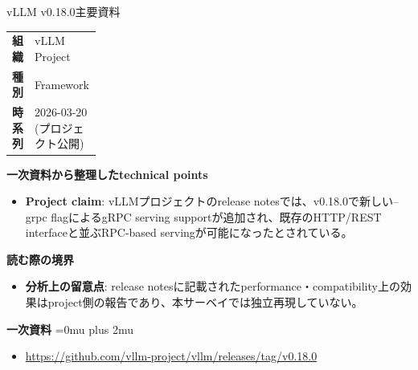 \begin{technicalnote}{vLLM v0.18.0}{主要資料}
\begingroup
\begin{tabularx}{\linewidth}{@{}>{\bfseries}p{0.22\linewidth}X@{}}
組織 & vLLM Project \\
種別 & Framework \\
時系列 & 2026-03-20 (プロジェクト公開) \\
\end{tabularx}
\smallskip
{\bfseries 一次資料から整理したtechnical points}
\begin{itemize}[leftmargin=1.5em,itemsep=0.35em]
\item \textbf{Project claim}: vLLMプロジェクトのrelease notesでは、v0.18.0で新しい--grpc flagによるgRPC serving supportが追加され、既存のHTTP/REST interfaceと並ぶRPC-based servingが可能になったとされている。
\end{itemize}
\begin{minipage}{\linewidth}
{\bfseries 読む際の境界}
\begin{itemize}[leftmargin=1.5em,itemsep=0.35em]
\item \textbf{分析上の留意点}: release notesに記載されたperformance・compatibility上の効果はproject側の報告であり、本サーベイでは独立再現していない。
\end{itemize}
\begin{samepage}
{\bfseries 一次資料}
\begingroup\sloppy
\Urlmuskip=0mu plus 2mu\relax
\begin{itemize}[leftmargin=1.5em,itemsep=0.25em]
\item {\scriptsize\url{https://github.com/vllm-project/vllm/releases/tag/v0.18.0}}
\end{itemize}
\endgroup
\end{samepage}
\end{minipage}
\endgroup
\end{technicalnote}
\medskip

